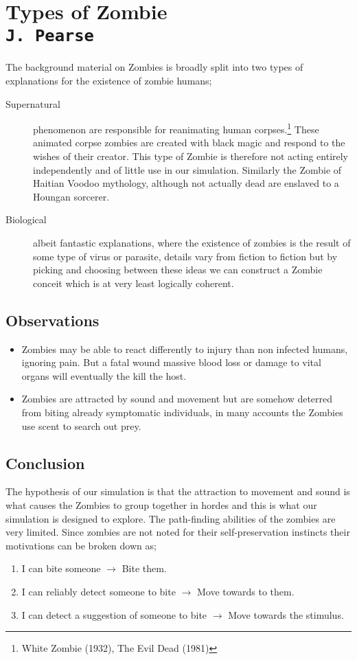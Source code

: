 \pagestyle{empty}

\section{Types of Zombie\\{\small\tt{J.~Pearse}}}
The background material on Zombies is broadly split into two types of explanations for the existence of zombie humans;
\begin{description}
\item[Supernatural] phenomenon are responsible for reanimating human corpses.\footnote{White Zombie (1932), The Evil Dead (1981)} These animated corpse zombies are created with black magic and respond to the wishes of their creator. This type of Zombie is therefore not acting entirely independently and of little use in our simulation. Similarly the Zombie of Haitian Voodoo mythology, although not actually dead are enslaved to a Houngan sorcerer.
\item[Biological] albeit fantastic explanations, where the existence of zombies is the result of some type of virus or parasite, details vary from fiction to fiction but by picking and choosing between these ideas we can construct a Zombie conceit which is at very least logically coherent.
\end{description}
\subsection{Observations}
\begin{itemize}
\item Zombies may be able to react differently to injury than non infected humans, ignoring pain. But a fatal wound massive blood loss or damage to vital organs will eventually the kill the host.
\item
Zombies are attracted by sound and movement but are somehow deterred from biting already symptomatic individuals, in many accounts the Zombies use scent to search out prey.
\end{itemize}

\subsection{Conclusion}
The hypothesis of our simulation is that the attraction to movement and sound is what causes the Zombies to group together in hordes and this is what our simulation is designed to explore. The path-finding abilities of the zombies are very limited.
Since zombies are not noted for their self-preservation instincts their motivations can be broken down as;
\begin{enumerate}
\item I can bite someone $\rightarrow$ Bite them.
\item I can reliably detect someone to bite $\rightarrow$ Move towards to them.
\item I can detect a suggestion of someone to bite $\rightarrow$ Move towards the stimulus.
\end{enumerate}
\clearpage
\endinput
